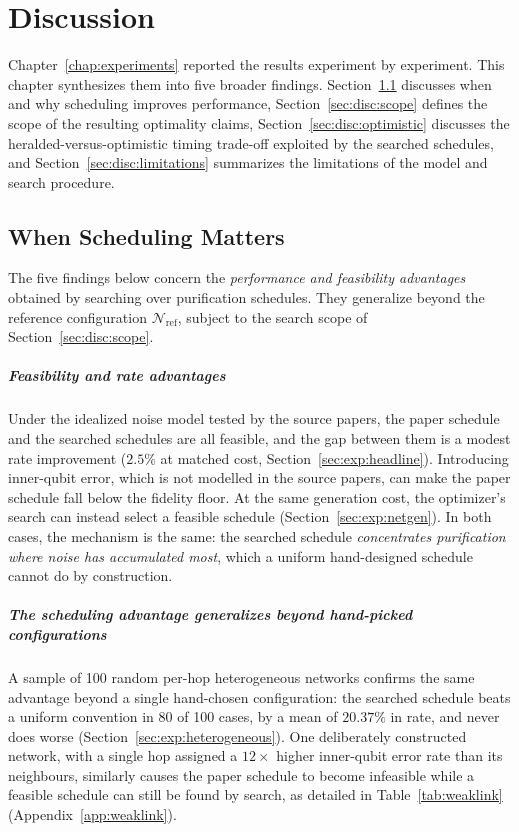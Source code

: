 \chapter{Discussion}
\label{chap:discussion}


Chapter~\ref{chap:experiments} reported the results experiment by experiment. This chapter synthesizes them into five broader findings. Section~\ref{sec:disc:synthesis} discusses when and why scheduling improves performance, Section~\ref{sec:disc:scope} defines the scope of the resulting optimality claims, Section~\ref{sec:disc:optimistic} discusses the heralded-versus-optimistic timing trade-off exploited by the searched schedules, and Section~\ref{sec:disc:limitations} summarizes the limitations of the model and search procedure.

\section{When Scheduling Matters}
\label{sec:disc:synthesis}

The five findings below concern the \emph{performance and feasibility advantages} obtained by searching over purification schedules. They generalize beyond the reference configuration $\mathcal{N}_\mathrm{ref}$, subject to the search scope of Section~\ref{sec:disc:scope}.

\paragraph{Feasibility and rate advantages}
Under the idealized noise model tested by the source papers, the paper schedule and the searched schedules are all feasible, and the gap between them is a modest rate improvement ($2.5\%$ at matched cost, Section~\ref{sec:exp:headline}). Introducing inner-qubit error, which is not modelled in the source papers, can make the paper schedule fall below the fidelity floor. At the same generation cost, the optimizer's search can instead select a feasible schedule (Section~\ref{sec:exp:netgen}). In both cases, the mechanism is the same: the searched schedule \emph{concentrates purification where noise has accumulated most}, which a uniform hand-designed schedule cannot do by construction.

\paragraph{The scheduling advantage generalizes beyond hand-picked configurations}
A sample of 100 random per-hop heterogeneous networks confirms the same advantage beyond a single hand-chosen configuration: the searched schedule beats a uniform convention in 80 of 100 cases, by a mean of $20.37\%$ in rate, and never does worse (Section~\ref{sec:exp:heterogeneous}). One deliberately constructed network, with a single hop assigned a $12\times$ higher inner-qubit error rate than its neighbours, similarly causes the paper schedule to become infeasible while a feasible schedule can still be found by search, as detailed in Table~\ref{tab:weaklink} (Appendix~\ref{app:weaklink}).


